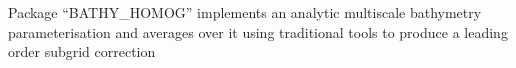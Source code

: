 
Package ``BATHY\_HOMOG'' implements an analytic multiscale
bathymetry parameterisation and averages over it using traditional
tools to produce a leading order subgrid correction
